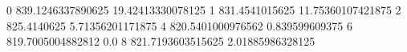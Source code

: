 0 839.1246337890625 19.42413330078125
1 831.4541015625 11.75360107421875
2 825.4140625 5.71356201171875
4 820.5401000976562 0.839599609375
6 819.7005004882812 0.0
8 821.7193603515625 2.01885986328125
